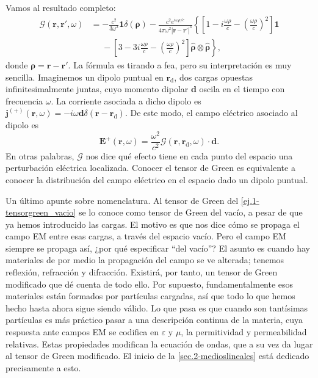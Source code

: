 \begin{example}
    Vamos al resultado completo:
    \begin{align}
        \nonumber
        \boldsymbol{\mathcal{G}}(\mathbf{r}, \mathbf{r}', \omega) &= - \frac{c^2}{3\omega^2}\mathbf{1}\delta(\boldsymbol{\rho}) - \frac{c^2 e^{i\omega \rho/c}}{4\pi\omega^2|\mathbf{r}-\mathbf{r}'|^3}\left\{\left[1-i\frac{\omega\rho}{c}-\left(\frac{\omega\rho}{c}\right)^2\right]\mathbf{1}\right.\\
        &\phantom{=}-\left.\left[3-3i\frac{\omega\rho}{c} - \left(\frac{\omega\rho}{c}\right)^2\right]\hat{\boldsymbol{\rho}}\otimes\hat{\boldsymbol{\rho}}\right\},
    \end{align}
    donde \(\boldsymbol{\rho} = \mathbf{r}-\mathbf{r}'\). La fórmula es tirando a fea, pero su interpretación es muy sencilla. Imaginemos un dipolo puntual en \(\mathbf{r}_\mathrm{d}\), dos cargas opuestas infinitesimalmente juntas, cuyo momento dipolar \(\mathbf{d}\) oscila en el tiempo con frecuencia \(\omega\). La corriente asociada a dicho dipolo es \(\mathbf{j}^{(+)}(\mathbf{r}, \omega) = -i\omega\mathbf{d} \delta(\mathbf{r}-\mathbf{r}_\mathrm{d})\). De este modo, el campo eléctrico asociado al dipolo es 
    \begin{equation*}
        \mathbf{E}^{+}(\mathbf{r}, \omega) = \frac{\omega^2}{c^2}\boldsymbol{\mathcal{G}}(\mathbf{r}, \mathbf{r}_\mathrm{d}, \omega)\cdot\mathbf{d}.
    \end{equation*}
    En otras palabras, \(\boldsymbol{\mathcal{G}}\) nos dice qué efecto tiene en cada punto del espacio una perturbación eléctrica localizada. Conocer el tensor de Green es equivalente a conocer la distribución del campo eléctrico en el espacio dado un dipolo puntual.
    
\end{example}
Un último apunte sobre nomenclatura. Al tensor de Green del \cref{ej.1-tensorgreen_vacio} se lo conoce como tensor de Green del vacío, a pesar de que ya hemos introducido las cargas. El motivo es que nos dice cómo se propaga el campo EM entre esas cargas, a través del espacio vacío. Pero el campo EM siempre se propaga así, ¿por qué especificar ``del vacío''? El asunto es cuando hay materiales de por medio la propagación del campo se ve alterada; tenemos reflexión, refracción y difracción. Existirá, por tanto, un tensor de Green modificado que dé cuenta de todo ello. Por supuesto, fundamentalmente esos materiales están formados por partículas cargadas, así que todo lo que hemos hecho hasta ahora sigue siendo válido. Lo que pasa es que cuando son tantísimas partículas es más práctico pasar a una descripción continua de la materia, cuya respuesta ante campos EM se codifica en \(\varepsilon\) y \(\mu\), la permitividad y permeabilidad relativas. Estas propiedades modifican la ecuación de ondas, que a su vez da lugar al tensor de Green modificado. El inicio de la \cref{sec.2-medioslineales} está dedicado precisamente a esto.

